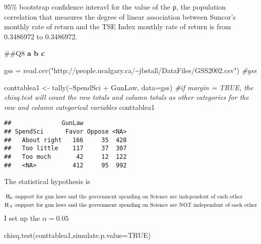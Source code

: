 \documentclass[
]{article}
\newenvironment{Shaded}{\begin{snugshade}}{\end{snugshade}}
\newcommand{\AttributeTok}[1]{\textcolor[rgb]{0.77,0.63,0.00}{#1}}
\newcommand{\CommentTok}[1]{\textcolor[rgb]{0.56,0.35,0.01}{\textit{#1}}}
\newcommand{\ConstantTok}[1]{\textcolor[rgb]{0.00,0.00,0.00}{#1}}
\newcommand{\FunctionTok}[1]{\textcolor[rgb]{0.00,0.00,0.00}{#1}}
\newcommand{\NormalTok}[1]{#1}
\newcommand{\OtherTok}[1]{\textcolor[rgb]{0.56,0.35,0.01}{#1}}
\newcommand{\SpecialCharTok}[1]{\textcolor[rgb]{0.00,0.00,0.00}{#1}}
\newcommand{\StringTok}[1]{\textcolor[rgb]{0.31,0.60,0.02}{#1}}
\begin{document}
95\% bootstrap confidence interavl for the value of the ρ, the
population correlation that measures the degree of linear association
between Suncor's monthly rate of return and the TSE Index monthly rate
of return is from 0.3486972 to 0.3486972.

\#\#Q8 \textbf{a b c}

\begin{Shaded}
\begin{Highlighting}[]
\NormalTok{gss }\OtherTok{=} \FunctionTok{read.csv}\NormalTok{(}\StringTok{"http://people.ucalgary.ca/\textasciitilde{}jbstall/DataFiles/GSS2002.csv"}\NormalTok{)}
\CommentTok{\#gss}
\end{Highlighting}
\end{Shaded}

\begin{Shaded}
\begin{Highlighting}[]
\NormalTok{conttablea1 }\OtherTok{\textless{}{-}} \FunctionTok{tally}\NormalTok{(}\SpecialCharTok{\textasciitilde{}}\NormalTok{SpendSci }\SpecialCharTok{+}\NormalTok{ GunLaw, }\AttributeTok{data=}\NormalTok{gss) }\CommentTok{\#if margin = TRUE, the chisq.test will count the row totals and column totals as other \textquotesingle{}categories\textquotesingle{} for the row and column categorical variables}
\NormalTok{conttablea1}
\end{Highlighting}
\end{Shaded}

\begin{verbatim}
##              GunLaw
## SpendSci      Favor Oppose <NA>
##   About right   166     35  428
##   Too little    117     37  307
##   Too much       42     12  122
##   <NA>          412     95  992
\end{verbatim}

The statistical hypothesis is

\[
\begin{align}
{\rm H}_{0}: & \text{support for gun laws and the government spending on Science are independent of each other} \\
{\rm H}_{A}: & \text{support for gun laws and the government spending on Science are NOT independent of each other} \\
\end{align}
\] I set up the \(\alpha = 0.05\)

\begin{Shaded}
\begin{Highlighting}[]
\FunctionTok{chisq.test}\NormalTok{(conttablea1,}\AttributeTok{simulate.p.value=}\ConstantTok{TRUE}\NormalTok{)}
\end{Highlighting}
\end{Shaded}
\end{document}
